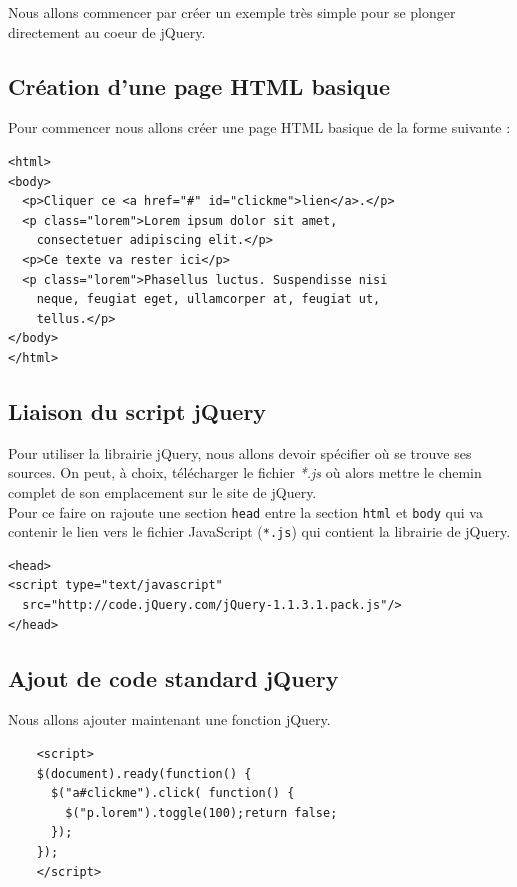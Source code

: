 \documentclass[10pt,a4paper,titlepage]{article}
\begin{document}
Nous allons commencer par créer un exemple très simple pour se plonger directement  au coeur de jQuery.

\subsection{Création d'une page HTML basique}

Pour commencer nous allons créer une page HTML basique de la forme suivante :

\begin{lstlisting}
<html>
<body>
  <p>Cliquer ce <a href="#" id="clickme">lien</a>.</p>
  <p class="lorem">Lorem ipsum dolor sit amet,
    consectetuer adipiscing elit.</p>
  <p>Ce texte va rester ici</p>
  <p class="lorem">Phasellus luctus. Suspendisse nisi
  	neque, feugiat eget, ullamcorper at, feugiat ut,
  	tellus.</p>
</body>
</html>
\end{lstlisting}

\subsection{Liaison du script jQuery}

Pour utiliser la librairie jQuery, nous allons devoir spécifier où se trouve ses sources. On peut, à choix, télécharger le fichier \emph{*.js} où alors mettre le chemin complet de son emplacement sur le site de jQuery. \\

Pour ce faire on rajoute une section \texttt{head} entre la section \texttt{html} et \texttt{body} qui va contenir le lien vers le fichier JavaScript (\texttt{*.js}) qui contient la librairie de jQuery.

\begin{lstlisting}
<head>
<script type="text/javascript"
  src="http://code.jQuery.com/jQuery-1.1.3.1.pack.js"/>
</head>
\end{lstlisting}

\subsection{Ajout de code standard jQuery}

Nous allons ajouter maintenant une fonction jQuery.

\begin{lstlisting}
	<script>
	$(document).ready(function() {
	  $("a#clickme").click( function() {
	    $("p.lorem").toggle(100);return false;
	  });
	});
	</script>
\end{lstlisting}
\end{document}

